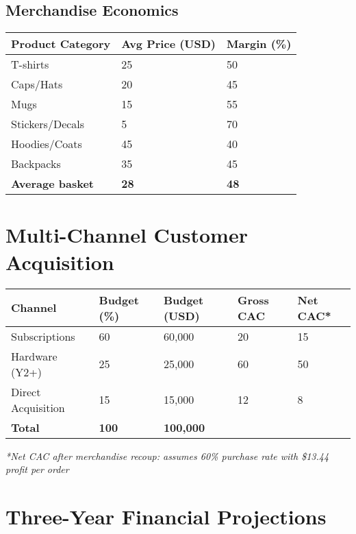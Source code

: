 \documentclass[11pt]{article}
\begin{document}
\subsection{Merchandise Economics}
\begin{table}[htbp]
\centering
\begin{tabularx}{\linewidth}{l Y Y}
\toprule
Product Category & Avg Price (USD) & Margin (\%) \\\midrule
T-shirts & 25 & 50 \\
Caps/Hats & 20 & 45 \\
Mugs & 15 & 55 \\
Stickers/Decals & 5 & 70 \\
Hoodies/Coats & 45 & 40 \\
Backpacks & 35 & 45 \\
\textbf{Average basket} & \textbf{28} & \textbf{48} \\
\bottomrule
\end{tabularx}
\end{table}

\section{Multi-Channel Customer Acquisition}

\begin{table}[htbp]
\centering
\begin{tabularx}{\linewidth}{l Y Y Y Y}
\toprule
Channel & Budget (\%) & Budget (USD) & Gross CAC & Net CAC* \\\midrule
Subscriptions & 60 & 60,000 & 20 & 15 \\
Hardware (Y2+) & 25 & 25,000 & 60 & 50 \\
Direct Acquisition & 15 & 15,000 & 12 & 8 \\\midrule
\textbf{Total} & \textbf{100} & \textbf{100,000} &  &  \\
\bottomrule
\end{tabularx}
\end{table}
\textit{*Net CAC after merchandise recoup: assumes 60\% purchase rate with \$13.44 profit per order}

\section{Three-Year Financial Projections}
\end{document}
